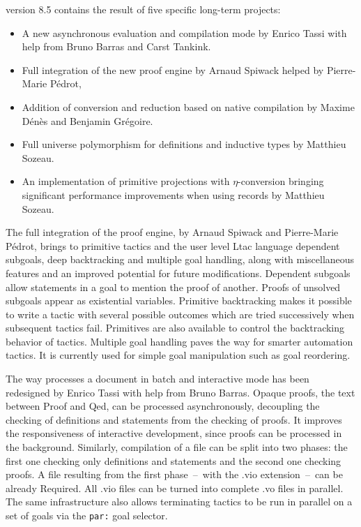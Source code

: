 {\Coq} version 8.5 contains the result of five specific long-term
projects:
\begin{itemize}
\item A new asynchronous evaluation and compilation mode by Enrico
  Tassi with help from Bruno Barras and Carst Tankink.
\item Full integration of the new proof engine by Arnaud Spiwack
  helped by Pierre-Marie Pédrot,
\item Addition of conversion and reduction based on native compilation
  by Maxime Dénès and Benjamin Grégoire.
\item Full universe polymorphism for definitions and inductive types by
  Matthieu Sozeau.
\item An implementation of primitive projections with $\eta$-conversion
  bringing significant performance improvements when using records by
  Matthieu Sozeau.
\end{itemize}

The full integration of the proof engine, by Arnaud Spiwack and
Pierre-Marie Pédrot, brings to primitive tactics and the user level
Ltac language dependent subgoals, deep backtracking and multiple goal
handling, along with miscellaneous features and an improved potential
for future modifications. Dependent subgoals allow statements in a
goal to mention the proof of another. Proofs of unsolved subgoals
appear as existential variables. Primitive backtracking makes it
possible to write a tactic with several possible outcomes which are
tried successively when subsequent tactics fail. Primitives are also
available to control the backtracking behavior of tactics. Multiple
goal handling paves the way for smarter automation tactics. It is
currently used for simple goal manipulation such as goal reordering.

The way {\Coq} processes a document in batch and interactive mode has
been redesigned by Enrico Tassi with help from Bruno Barras.  Opaque
proofs, the text between Proof and Qed, can be processed
asynchronously, decoupling the checking of definitions and statements
from the checking of proofs.  It improves the responsiveness of
interactive development, since proofs can be processed in the
background.  Similarly, compilation of a file can be split into two
phases: the first one checking only definitions and statements and the
second one checking proofs.  A file resulting from the first
phase~--~with the .vio extension~--~can be already Required.  All .vio
files can be turned into complete .vo files in parallel.  The same
infrastructure also allows terminating tactics to be run in parallel
on a set of goals via the \verb=par:= goal selector.

